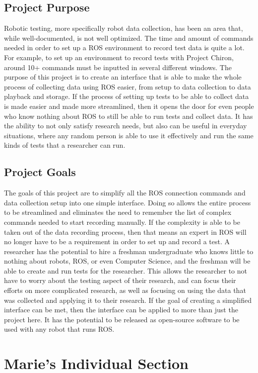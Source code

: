 \documentclass[onecolumn, draftclsnofoot,10pt, compsoc]{IEEEtran}
\begin{document}
\subsection{Project Purpose}
Robotic testing, more specifically robot data collection, has been an area that, while well-documented, is not well optimized. The time and amount of commands needed in order to set up a ROS environment to record test data is quite a lot. For example, to set up an environment to record tests with Project Chiron, around 10+ commands must be inputted in several different windows. The purpose of this project is to create an interface that is able to make the whole process of collecting data using ROS easier, from setup to data collection to data playback and storage. If the process of setting up tests to be able to collect data is made easier and made more streamlined, then it opens the door for even people who know nothing about ROS to still be able to run tests and collect data. It has the ability to not only satisfy research needs, but also can be useful in everyday situations, where any random person is able to use it effectively and run the same kinds of tests that a researcher can run.
\subsection{Project Goals}
The goals of this project are to simplify all the ROS connection commands and data collection setup into one simple interface. Doing so allows the entire process to be streamlined and eliminates the need to remember the list of complex commands needed to start recording manually. If the complexity is able to be taken out of the data recording process, then that means an expert in ROS will no longer have to be a requirement in order to set up and record a test. A researcher has the potential to hire a freshman undergraduate who knows little to nothing about robots, ROS, or even Computer Science, and the freshman will be able to create and run tests for the researcher. This allows the researcher to not have to worry about the testing aspect of their research, and can focus their efforts on more complicated research, as well as focusing on using the data that was collected and applying it to their research. If the goal of creating a simplified interface can be met, then the interface can be applied to more than just the project here. It has the potential to be released as open-source software to be used with any robot that runs ROS.

\section{Marie's Individual Section}
\end{document}

